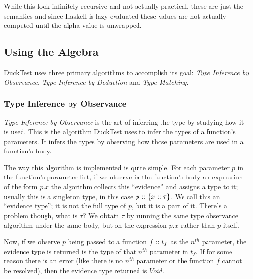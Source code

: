 \documentclass{scrartcl}
\begin{document}
\begin{multicols}{2}

While this look infinitely recursive and not actually practical,
these are just the semantics and since Haskell is lazy-evaluated
these values are not actually computed until the alpha value is
unwrapped.

\subsection*{Using the Algebra}

DuckTest uses three primary algorithms to accomplish its goal;
\emph{Type Inference by Observance}, \emph{Type Inference by Deduction}
and \emph{Type Matching}.

\subsubsection*{Type Inference by Observance}

\emph{Type Inference by Observance} is the art of inferring the
type by studying how it is used. This is the algorithm DuckTest
uses to infer the types of a function's parameters. It infers the
types by observing how those parameters are used in a function's
body.

The way this algorithm is implemented is quite simple. For each
parameter $p$ in the function's parameter list, if we observe in the
function's body an expression of the form $p.x$ the algorithm collects
this ``evidence'' and assigns a type to it; usually this is a singleton
type, in this case $p{\ ::\ } \{x{\ ::\ } \tau\}$. We call this an ``evidence type''; it is
not the full type of $p$, but it is a part of it. There's a problem
though, what is $\tau$? We obtain $\tau$ by running the same type observance
algorithm under the same body, but on the expression $p.x$ rather than $p$ itself.

Now, if we observe $p$ being passed to a function $f{\ ::\ } t_f$ as the
$n^{th}$ parameter, the evidence type is returned is the type of that
$n^{th}$ parameter in $t_f$. If for some reason there is an error (like
there is no $n^{th}$ parameter or the function $f$ cannot be resolved),
then the evidence type returned is $Void$.


\end{multicols}
\end{document}

